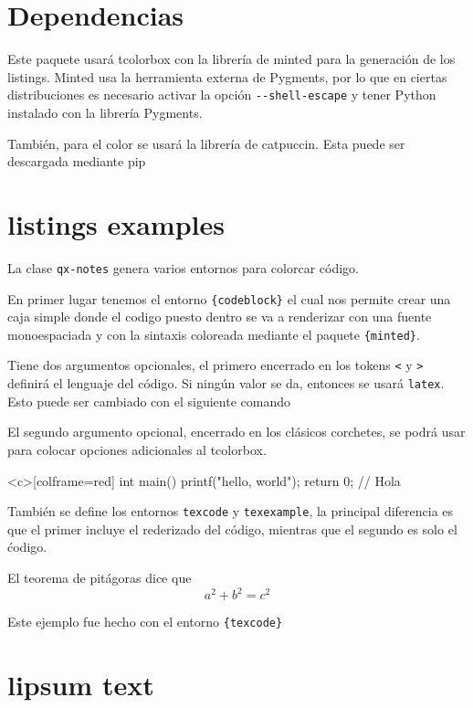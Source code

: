 \documentclass[theme=mocha, pagecolor=true, pagesize=mobile]{qx-files/qx-notes}
\begin{document}
  \section{Dependencias}

  Este paquete usará tcolorbox con la librería de minted para la generación de los listings. Minted usa la herramienta externa de Pygments, por lo que en ciertas distribuciones es necesario activar la opción \verb|--shell-escape| y tener Python instalado con la librería Pygments.

  También, para el color se usará la librería de catpuccin. Esta puede ser descargada mediante pip


  \section{listings examples}

  La clase \verb|qx-notes| genera varios entornos para colorcar código.

  En primer lugar tenemos el entorno \verb|{codeblock}| el cual nos permite crear una caja simple donde el codigo puesto dentro se va a renderizar con una fuente monoespaciada y con la sintaxis coloreada mediante el paquete \verb|{minted}|.

  Tiene dos argumentos opcionales, el primero encerrado en los tokens \verb|<| y \verb|>| definirá el lenguaje del código. Si ningún valor se da, entonces se usará \verb|latex|. Esto puede ser cambiado con el siguiente comando
  \begin{texcode}
  \end{texcode}
  
  El segundo argumento opcional, encerrado en los clásicos corchetes, se podrá usar para colocar opciones adicionales al tcolorbox.

  \begin{texexample}
    \begin{codeblock}<c>[colframe=red]
      int main() {
        printf("hello, world");
        return 0;
      }
      // Hola
    \end{codeblock}
  \end{texexample}

  También se define los entornos \verb|texcode| y \verb|texexample|, la principal diferencia es que el primer incluye el rederizado del código, mientras que el segundo es solo el ćodigo.

  \begin{codeblock}
    \begin{texexample}
      El teorema de pitágoras dice que
      \[ a^2 + b^2 = c^2 \]
    \end{texexample}
  \end{codeblock}

  \begin{texexample}
    \begin{texcode}
      Este ejemplo fue hecho con el entorno
      \verb|{texcode}|
    \end{texcode}
  \end{texexample}


  \section{lipsum text}

  \lipsum
\end{document}
